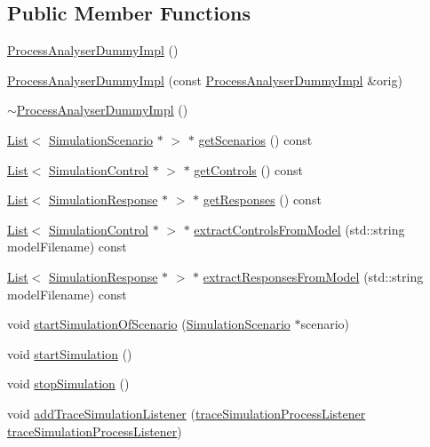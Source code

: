 \subsection*{Public Member Functions}
\begin{DoxyCompactItemize}
\item 
\hyperlink{class_process_analyser_dummy_impl_a5db24b827b7a48066deffe5229b74a32}{Process\+Analyser\+Dummy\+Impl} ()
\item 
\hyperlink{class_process_analyser_dummy_impl_a7157c55cb39b5aaab4c3f00bf3fcc347}{Process\+Analyser\+Dummy\+Impl} (const \hyperlink{class_process_analyser_dummy_impl}{Process\+Analyser\+Dummy\+Impl} \&orig)
\item 
\hyperlink{class_process_analyser_dummy_impl_aea9c62c96a8e1eb12568df16667db33e}{$\sim$\+Process\+Analyser\+Dummy\+Impl} ()
\item 
\hyperlink{class_list}{List}$<$ \hyperlink{class_simulation_scenario}{Simulation\+Scenario} $\ast$ $>$ $\ast$ \hyperlink{class_process_analyser_dummy_impl_a9a91a2a398e58850f53a708a6a9d5fcf}{get\+Scenarios} () const 
\item 
\hyperlink{class_list}{List}$<$ \hyperlink{class_simulation_control}{Simulation\+Control} $\ast$ $>$ $\ast$ \hyperlink{class_process_analyser_dummy_impl_ac1fd3d1c3329056a269594647a8a5d8d}{get\+Controls} () const 
\item 
\hyperlink{class_list}{List}$<$ \hyperlink{class_simulation_response}{Simulation\+Response} $\ast$ $>$ $\ast$ \hyperlink{class_process_analyser_dummy_impl_a2200ea0a092a988ea550ef6c6a2abaef}{get\+Responses} () const 
\item 
\hyperlink{class_list}{List}$<$ \hyperlink{class_simulation_control}{Simulation\+Control} $\ast$ $>$ $\ast$ \hyperlink{class_process_analyser_dummy_impl_ad0d2050ee20f8250312401044a33ef2d}{extract\+Controls\+From\+Model} (std\+::string model\+Filename) const 
\item 
\hyperlink{class_list}{List}$<$ \hyperlink{class_simulation_response}{Simulation\+Response} $\ast$ $>$ $\ast$ \hyperlink{class_process_analyser_dummy_impl_a2e4d0b4779c0c2eb0a563f0f3ba3c8de}{extract\+Responses\+From\+Model} (std\+::string model\+Filename) const 
\item 
void \hyperlink{class_process_analyser_dummy_impl_a6067fc614277fc1322ad41b359121d76}{start\+Simulation\+Of\+Scenario} (\hyperlink{class_simulation_scenario}{Simulation\+Scenario} $\ast$scenario)
\item 
void \hyperlink{class_process_analyser_dummy_impl_a413b820d11725519356ad797cda6913b}{start\+Simulation} ()
\item 
void \hyperlink{class_process_analyser_dummy_impl_a03d62ac02932315ff159c6004681868e}{stop\+Simulation} ()
\item 
void \hyperlink{class_process_analyser_dummy_impl_a34a57be3360cd6e8b428430e37cf9cb2}{add\+Trace\+Simulation\+Listener} (\hyperlink{_trace_manager_8h_a7ff1963642ecda8c9a76991b351f0385}{trace\+Simulation\+Process\+Listener} \hyperlink{_trace_manager_8h_a7ff1963642ecda8c9a76991b351f0385}{trace\+Simulation\+Process\+Listener})
\end{DoxyCompactItemize}


